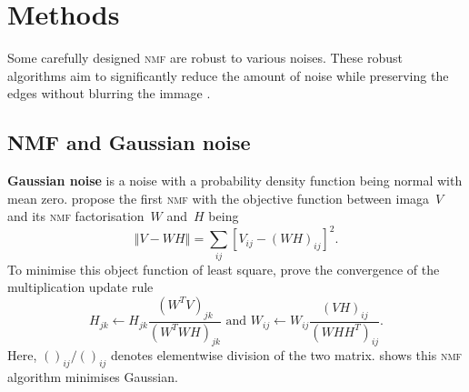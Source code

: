\section{Methods \label{chapter2}}
Some carefully designed \textsc{nmf} are robust to various noises. These robust algorithms aim to significantly reduce the amount of noise while preserving the edges without blurring the immage \citep{barbu2013variational}. %

\subsection{NMF and Gaussian noise}
\textbf{Gaussian noise} is a noise with a probability density function being normal with mean zero. \citet{lee2001algorithms} propose the first \textsc{nmf} with the objective function between imaga~$V$ and its \textsc{nmf} factorisation~$W$ and~$H$ being
\begin{equation}
  \left\Vert V-WH \right\Vert= \sum_{ij} \left[V_{ij}-(WH)_{ij}\right]^2.\label{eq:obnmf}
\end{equation}
To minimise this object function of least square, \citet{lee2001algorithms} prove the convergence of the multiplication update rule
\begin{equation}
H_{jk}\leftarrow H_{jk}\frac{(W^{T}V)_{jk}}{(W^{T}WH)_{jk}} \text{ and } W_{ij}\leftarrow W_{ij}\frac{(VH)_{ij}}{(WHH^{T})_{ij}}.\label{eq:nmf}
\end{equation}
Here, $()_{ij}/()_{ij}$ denotes elementwise division of the two matrix. \citet{liu2015performance} shows this \textsc{nmf} algorithm minimises Gaussian.


